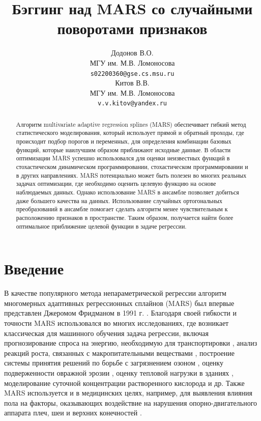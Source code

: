 \documentclass{article}
\title{Бэггинг над MARS со случайными поворотами признаков}
\author{ Додонов В.О.\\%
	МГУ им. М.В. Ломоносова\\
	\texttt{s02200360@gse.cs.msu.ru} \\
	\And
        Китов В.В.\\
        МГУ им. М.В. Ломоносова\\
	\texttt{v.v.kitov@yandex.ru} \\
}
\date{}
\newcommand{\cmmnt}[1]{}
\begin{document}
\maketitle


\begin{abstract}
Алгоритм multivariate adaptive regression splines (MARS) обеспечивает гибкий
метод статистического моделирования, который использует прямой и обратный проходы, где происходит подбор порогов и переменных, для определения комбинации
базовых функций, которые наилучшим образом приближают исходные данные.
В области оптимизации MARS успешно использовался для оценки неизвестных функций в стохастическом динамическом программировании, стохастическом программировании и в других направлениях. MARS потенциально может быть полезен во многих реальных задачах оптимизации, где необходимо оценить целевую функцию на основе наблюдаемых данных. Однако использование MARS в ансамбле позволяет добиться даже большего качества на данных. Использование случайных ортогональных преобразований в ансамбле помогает сделать алгоритм менее чувствительным к расположению признаков в пространстве. Таким образом, получается найти более оптимальное приближение целевой функции в задаче регрессии.
\end{abstract}



\section{Введение}
В качестве популярного метода непараметрической регрессии алгоритм 
многомерных адаптивных регрессионных сплайнов (MARS) был впервые представлен Джеромом Фридманом в 1991 г. \cite{friedman1991multivariate}. Благодаря своей гибкости и точности MARS использовался во многих исследованиях, где возникает классическая для машинного обучения задача регрессии, включая прогнозирование спроса на энергию, необходимую для транспортировки \cmmnt{(M.A. Sahraei, H. Duman, M.Y. Çodur et al, 2021)} \cite{sahraei2021prediction}, анализ реакций роста, связанных с макропитательными веществами \cmmnt{(M Akin et al, 2020)} \cite{akin2020analysis}, построение системы принятия решений по борьбе с загрязнением озоном \cmmnt{(Yang, Chen, Chang, Sattler, \& Wen, 2009)} \cite{yang2009decision}, оценку подверженности овражной эрозии \cmmnt{(Conoscenti, Agnesi, Cama, Caraballo-Arias, \& Rotigliano, 2018)} \cite{conoscenti2018assessment}, оценку тепловой нагрузки в зданиях \cmmnt{(Roy, Roy, \& Balas, 2018)} \cite{roy2018estimating}, моделирование суточной концентрации растворенного кислорода \cmmnt{(Heddam \& Kisi, 2018)} \cite{heddam2018modelling} и др.
Также MARS используется и в медицинских целях, например, для выявления влияния пола на факторы, оказывающих воздействие на нарушения опорно-двигательного аппарата плеч, шеи и верхних конечностей
\cmmnt{(Serrano, Sanchez, Lasheras, Iglesias-Rodríguez, \& Valverde, 2020)} \cite{serrano2020identification}.
\end{document}
